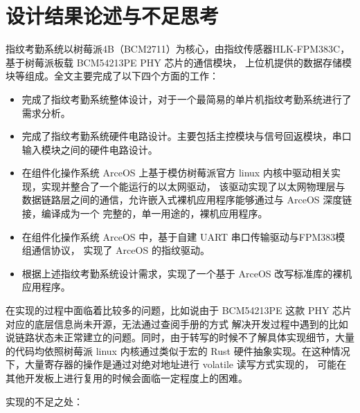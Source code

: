 \section{设计结果论述与不足思考}

    指纹考勤系统以树莓派4B（BCM2711）为核心，由指纹传感器HLK-FPM383C，基于树莓派板载 BCM54213PE PHY 芯片的通信模块，
    上位机提供的数据存储模块等组成。全文主要完成了以下四个方面的工作：

    \begin{itemize}
        \item 完成了指纹考勤系统整体设计，对于一个最简易的单片机指纹考勤系统进行了需求分析。
        \item 完成了指纹考勤系统硬件电路设计。主要包括主控模块与信号回返模块，串口输入模块之间的硬件电路设计。
        \item 在组件化操作系统 ArceOS 上基于模仿树莓派官方 linux 内核中驱动相关实现，实现并整合了一个能运行的以太网驱动，
            该驱动实现了以太网物理层与数据链路层之间的通信，允许嵌入式裸机应用程序能够通过与 ArceOS 深度链接，编译成为一个
            完整的，单一用途的，裸机应用程序。
        \item 在组件化操作系统 ArceOS 中，基于自建 UART 串口传输驱动与FPM383模组通信协议\cite{noauthor_fpm383c_nodate}，
            实现了 ArceOS 的指纹驱动。
        \item 根据上述指纹考勤系统设计需求，实现了一个基于 ArceOS 改写标准库的裸机应用程序。
    \end{itemize}

    在实现的过程中面临着比较多的问题，比如说由于 BCM54213PE 这款 PHY 芯片对应的底层信息尚未开源，无法通过查阅手册的方式
    解决开发过程中遇到的比如说链路状态未正常建立的问题。同时，由于转写的时候不了解具体实现细节，大量的代码均依照树莓派 linux
    内核通过类似于宏的 Rust 硬件抽象实现。在这种情况下，大量寄存器的操作是通过对绝对地址进行 volatile 读写方式实现的，
    可能在其他开发板上进行复用的时候会面临一定程度上的困难。

    实现的不足之处：

